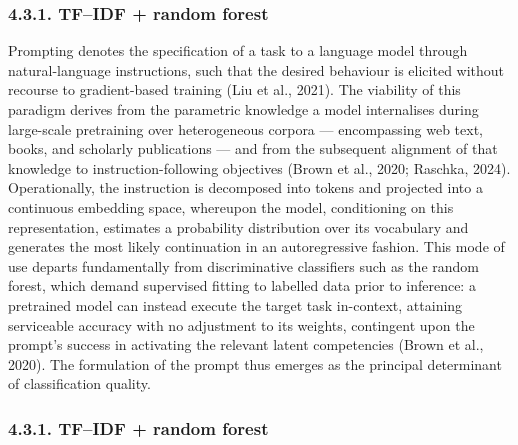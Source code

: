 \documentclass[runningheads]{llncs}
\begin{document}
\subsubsection{4.3.1. TF–IDF + random forest}

Prompting denotes the specification of a task to a language model through natural-language instructions, such that the desired behaviour is elicited without recourse to gradient-based training (Liu et al., 2021). The viability of this paradigm derives from the parametric knowledge a model internalises during large-scale pretraining over heterogeneous corpora — encompassing web text, books, and scholarly publications — and from the subsequent alignment of that knowledge to instruction-following objectives (Brown et al., 2020; Raschka, 2024). Operationally, the instruction is decomposed into tokens and projected into a continuous embedding space, whereupon the model, conditioning on this representation, estimates a probability distribution over its vocabulary and generates the most likely continuation in an autoregressive fashion. This mode of use departs fundamentally from discriminative classifiers such as the random forest, which demand supervised fitting to labelled data prior to inference: a pretrained model can instead execute the target task in-context, attaining serviceable accuracy with no adjustment to its weights, contingent upon the prompt's success in activating the relevant latent competencies (Brown et al., 2020). The formulation of the prompt thus emerges as the principal determinant of classification quality.

\subsubsection{4.3.1. TF–IDF + random forest}
\end{document}
